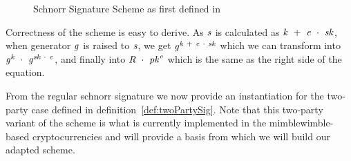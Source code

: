 \begin{figure}
    \begin{center}
        \fbox{
        \begin{varwidth}{\textwidth}
            \procedure[linenumbering]{$\procSetup{\varSecParam}$} {
            \varKey \sample \cnstIntegersPrimeWithoutZero{\varPrime} \\
            \pcreturn (\varSecKey \opAssign \varKey \opSeperate \varPubKey \opAssign \funGen{\varKey})
            }
            \procedure[linenumbering]{$\procSign{\varMsg}{\varSecKey}$}{
            \varNonce \sample \cnstIntegersPrimeWithoutZero{\varPrime} \\
            \varRand \opAssign \funGen{\varNonce} \\
            \varSchnorrChallenge \opAssign \funHash{\varMsg \opConc \varRand \opConc \varPubKey} \\
            \varS \opAssign \varNonce \opAddScalar \varSchnorrChallenge \opTimesScalar \varSecKey \\
            \pcreturn \varSignature \opAssign (\varS, \varRand)
            }
            \procedure[linenumbering]{$\procVerf{\varMsg}{\varSignature}{\varPubKey}$} {
            (\varS \opSeperate \varRand) \opFunResult \varSignature \\
            \varSchnorrChallenge \opAssign \funHash{\varMsg \opConc \varRand \opConc \varPubKey} \\
            \pcreturn \funGen{\varS} \opEq \varRand \opAddPoint \opPointScalar{\varPubKey}{\varSchnorrChallenge}
            }
        \end{varwidth}
        }
    \end{center}
    \caption{Schnorr Signature Scheme as first defined in~\cite{schnorr1989efficient}}
    \label{fig:schnorr}
\end{figure}
Correctness of the scheme is easy to derive. As $\mathit{s}$ is calculated as $\mathit{k} ~+~ \mathit{e} ~\cdot~ \mathit{sk}$, when generator $\mathit{g}$ is raised to $\mathit{s}$, we get
$\mathit{g}^{\mathit{k} ~+~ \mathit{e} ~\cdot~ \mathit{sk}}$ which we can transform into $\mathit{g}^{\mathit{k}} ~\cdot~ \mathit{g}^{\mathit{sk} ~\cdot~ \mathit{e}}$, and finally
into $\mathit{R} ~\cdot~ \mathit{pk}^{\mathit{e}}$ which is the same as the right side of the equation.

From the regular schnorr signature we now provide an instantiation for the two-party case defined in definition~\ref{def:twoPartySig}. Note that this two-party variant of the scheme is what is
currently implemented in the mimblewimble-based cryptocurrencies and will provide a basis from which we will build our adapted scheme.

